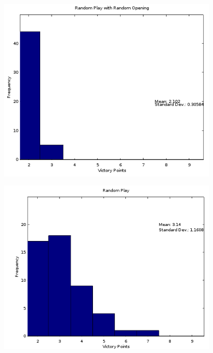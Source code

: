 \documentclass[]{article}
\begin{document}
\begin{figure}[H]
\centering
\begin{minipage}{.5\textwidth}
  \centering
  \includegraphics[width=.9\linewidth]{figures/roRandom}
  \label{fig:opening1}
\end{minipage}%
\begin{minipage}{.5\textwidth}
  \centering
  \includegraphics[width=.9\linewidth]{figures/hoRandom}
  \label{fig:opening2}
\end{minipage}
\end{figure}
\end{document}
